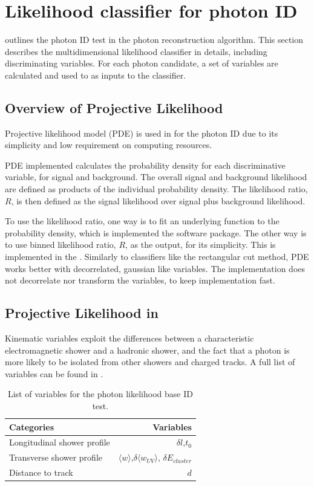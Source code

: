 \section{Likelihood classifier for photon ID}
\label{sec:photonLikelihood}

 outlines the photon ID test in the photon reconstruction algorithm. This section describes the multidimensional likelihood classifier in details, including discriminating variables. For each photon candidate, a set of variables are calculated and used to as inputs to the classifier.

\subsection{Overview of Projective Likelihood}
\label{sec:photonPDE}
Projective likelihood model (PDE) is used in \pandora for the photon ID due to its simplicity and low requirement on computing resources.

PDE implemented calculates the probability density for each discriminative variable, for signal and background. The overall signal and background likelihood are defined as products of the individual probability density. The likelihood ratio, $R$, is then defined as the signal likelihood over signal plus background likelihood.

To use the likelihood ratio, one way is to fit an underlying function to the probability density, which is implemented the \TMVA software package. The other way is to use binned likelihood ratio, $R$, as the output, for its simplicity. This is implemented in the \pandora. Similarly to classifiers like the rectangular cut method, PDE works better with decorrelated, gaussian like variables. The \pandora implementation does not decorrelate nor transform the variables, to keep implementation fast.

\subsection{Projective Likelihood in \pandora}

Kinematic variables exploit the differences between a characteristic electromagnetic shower and a hadronic shower, and the fact that a photon is more likely to be isolated from other showers and charged tracks. A full list of variables can be found in .

\begin{table}[htbp] \centering \smallskip
\begin{tabular}{l r }
\hline
Categories&  Variables\\
\hline
Longitudinal shower profile & $\delta{l}$,$t_0$ \\
Transverse shower profile & $\langle{w}\rangle$,$\delta{\langle{w_{UV}}\rangle}$, $\delta E_{cluster}$ \\
Distance to track &  $d$ \\
\hline
\hline
\end{tabular}
\caption
{List of variables for the photon likelihood base ID test.}
\label{tab:photonPhotonIDvar}
\end{table}

